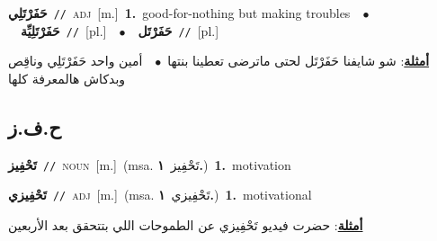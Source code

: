 \documentclass[10pt,a4paper,twoside]{article} %
\begin{document}
\begin{multicols}{2}
{\setlength\topsep{0pt}\textbf{\foreignlanguage{arabic}{حَفَرْتَلِي}}\ {\color{gray}\texttt{//}\color{black}}\ \textsc{adj}\ [m.]\ \textbf{1.}~good-for-nothing but making troubles\ \ $\bullet$\ \ \setlength\topsep{0pt}\textbf{\foreignlanguage{arabic}{حَفَرْتَلِيِّة}}\ {\color{gray}\texttt{//}\color{black}}\ [pl.]\ \ $\bullet$\ \ \setlength\topsep{0pt}\textbf{\foreignlanguage{arabic}{حَفَرْتَل}}\ {\color{gray}\texttt{//}\color{black}}\ [pl.]\  \begin{flushright}\color{gray}\foreignlanguage{arabic}{\textbf{\underline{\foreignlanguage{arabic}{أمثلة}}}: شو شايفنا حَفَرْتَل لحتى ماترضى تعطينا بنتها\ $\bullet$\ \  أمين واحد حَفَرْتَلِي وناقِص وبدكاش هالمعرفة كلها}\end{flushright}\color{black}} \vspace{2mm}

\vspace{-3mm}
\subsection*{\color{blue}\foreignlanguage{arabic}{ح.ف.ز}\color{blue}{}} 

{\setlength\topsep{0pt}\textbf{\foreignlanguage{arabic}{تَحْفِيز}}\ {\color{gray}\texttt{//}\color{black}}\ \textsc{noun}\ [m.]\ \color{gray}(msa. \foreignlanguage{arabic}{تَحْفِيز}~\foreignlanguage{arabic}{\textbf{١.}})\color{black}\ \textbf{1.}~motivation\ } \vspace{2mm}

{\setlength\topsep{0pt}\textbf{\foreignlanguage{arabic}{تَحْفِيزي}}\ {\color{gray}\texttt{//}\color{black}}\ \textsc{adj}\ [m.]\ \color{gray}(msa. \foreignlanguage{arabic}{تَحْفِيزي}~\foreignlanguage{arabic}{\textbf{١.}})\color{black}\ \textbf{1.}~motivational\  \begin{flushright}\color{gray}\foreignlanguage{arabic}{\textbf{\underline{\foreignlanguage{arabic}{أمثلة}}}: حضرت فيديو تَحْفِيزي  عن الطموحات اللي بتتحقق بعد الأربعين}\end{flushright}\color{black}} \vspace{2mm}


\end{multicols}
\end{document}
